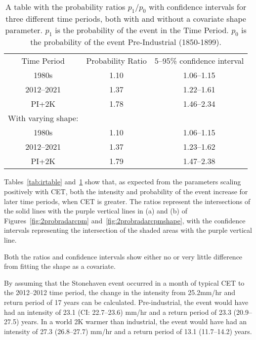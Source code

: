 \begin{table}[H]
   \centering
    \begin{tabular}{c c c}
        Time Period & Probability Ratio & 5--95\% confidence interval \\
        1980s & 1.10 & 1.06--1.15 \\
        2012--2021 & 1.37 & 1.22--1.61 \\
        PI+2K & 1.78 & 1.46--2.34 \\
        With varying shape: && \\
        1980s & 1.10 & 1.06--1.15 \\
        2012--2021 & 1.37 & 1.23--1.62 \\
        PI+2K & 1.79 & 1.47--2.38 \\
    \end{tabular}
    \caption[A table with the probability ratios.]{A table with the probability ratios $p_1/p_0$ with confidence intervals for three different time periods,
        both with and without a covariate shape parameter.
    $p_1$ is the probability of the event in the Time Period.
    $p_0$ is the probability of the event Pre-Industrial (1850-1899).}
    \label{tab:prtable}
\end{table}

Tables~\ref{tab:irtable} and~\ref{tab:prtable} show that,
    as expected from the parameters scaling positively with CET,
    both the intensity and probability of the event increase for later time periods,
    when CET is greater.
The ratios represent the intersections of the solid lines with the purple vertical lines in (a) and (b)
    of Figures~\ref{fig:2probradarcpm} and~\ref{fig:2probradarcpmshape},
    with the confidence intervals representing the intersection of the shaded areas with the purple vertical line.

Both the ratios and confidence intervals show either no or very little difference from fitting the shape as a covariate.

By assuming that the Stonehaven event occurred in a month of typical CET to the 2012--2012 time period,
    the change in the intensity from 25.2mm/hr and return period of 17 years can be calculated.
Pre-industrial,
    the event would have had an intensity of 23.1 (CI: 22.7--23.6) mm/hr and a return period
    of 23.3 (20.9--27.5) years.
In a world 2K warmer than industrial,
     the event would have had an intensity of 27.3 (26.8--27.7) mm/hr and a return period
    of 13.1 (11.7--14.2) years.

